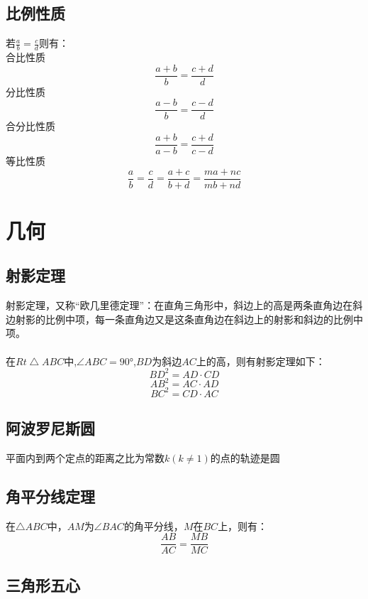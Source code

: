 \documentclass[UTF8]{ctexart}
\begin{document}
		\subsection{比例性质}
			若$\frac{a}{b}=\frac{c}{d}$则有：\\
			合比性质
			\[\frac{a+b}{b}=\frac{c+d}{d}\]
			分比性质
			\[\frac{a-b}{b}=\frac{c-d}{d}\]
			合分比性质
			\[\frac{a+b}{a-b}=\frac{c+d}{c-d}\]
			等比性质
			\[\frac{a}{b}=\frac{c}{d}=\frac{a+c}{b+d}=\frac{ma+nc}{mb+nd}\]
	\section{几何}
		\subsection{射影定理}
			射影定理，又称“欧几里德定理”：在直角三角形中，斜边上的高是两条直角边在斜边射影的比例中项，每一条直角边又是这条直角边在斜边上的射影和斜边的比例中项。\\
			\\
			在$Rt\bigtriangleup  ABC$中,$\angle ABC=\ang{90}$,$BD$为斜边$AC$上的高，则有射影定理如下：
			\[BD^2=AD\cdot CD\]
			\[AB^2=AC\cdot AD\]
			\[BC^2=CD\cdot AC\]
		\subsection{阿波罗尼斯圆}
			平面内到两个定点的距离之比为常数$k(k\neq1)$的点的轨迹是圆
		\subsection{角平分线定理}
			在$\bigtriangleup ABC$中，$AM$为$\angle BAC$的角平分线，$M$在$BC$上，则有：
			\[\frac{AB}{AC}=\frac{MB}{MC}\]
		\subsection{三角形五心}
\end{document}
